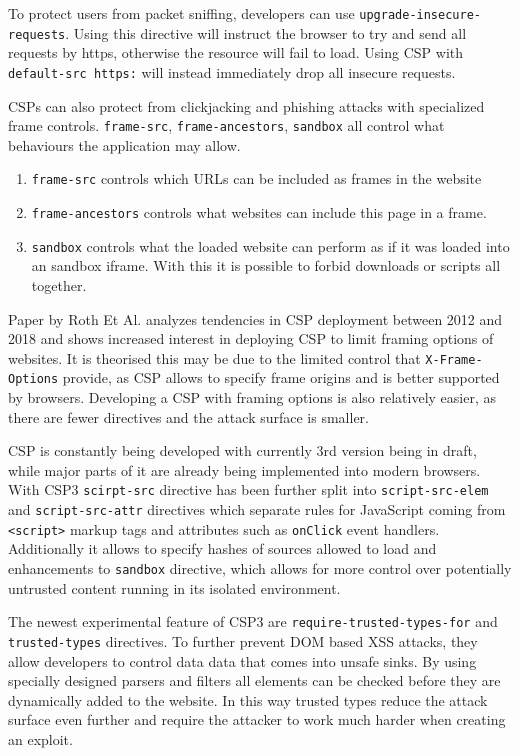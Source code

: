 To protect users from packet sniffing, developers can use \texttt{upgrade-insecure-requests}.
Using this directive will instruct the browser to try and send all requests by https, otherwise the resource will fail to load.
Using CSP with \texttt{default-src https:} will instead immediately drop all insecure requests.

CSPs can also protect from clickjacking and phishing attacks with specialized frame controls. 
\texttt{frame-src}, \texttt{frame-ancestors}, \texttt{sandbox} all control what behaviours the application may allow.
\begin{enumerate}
	\item \texttt{frame-src} controls which URLs can be included as frames in the website
	\item \texttt{frame-ancestors} controls what websites can include this page in a frame. 
	\item \texttt{sandbox} controls what the loaded website can perform as if it was loaded into an sandbox iframe. With this it is possible to forbid downloads or scripts all together.
\end{enumerate}
Paper by Roth Et Al. analyzes tendencies in CSP deployment between 2012 and 2018 and shows increased interest in deploying CSP to limit framing options of websites. \cite{osti_10173479}
It is theorised this may be due to the limited control that \texttt{X-Frame-Options} provide, as CSP allows to specify frame origins and is better supported by browsers.
Developing a CSP with framing options is also relatively easier, as there are fewer directives and the attack surface is smaller.


CSP is constantly being developed with currently 3rd version being in draft, while major parts of it are already being implemented into modern browsers.
With CSP3 \texttt{scirpt-src} directive has been further split into \texttt{script-src-elem} and \texttt{script-src-attr} directives which separate rules for JavaScript coming from \texttt{<script>} markup tags and attributes such as \texttt{onClick} event handlers.
Additionally it allows to specify hashes of sources allowed to load and enhancements to \texttt{sandbox} directive, which allows for more control over potentially untrusted content running in its isolated environment.

The newest experimental feature of CSP3 are \texttt{require-trusted-types-for} and \texttt{trusted-types} directives. \cite{TTwebdev} \cite{TTmozdev}
To further prevent DOM based XSS attacks, they allow developers to control data data that comes into unsafe sinks.
By using specially designed parsers and filters all elements can be checked before they are dynamically added to the website.
In this way trusted types reduce the attack surface even further and require the attacker to work much harder when creating an exploit.

